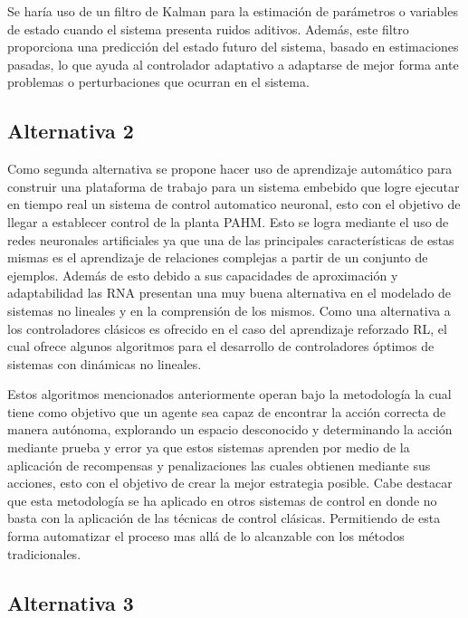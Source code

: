\documentclass[12pt]{article}
\begin{document}
Se haría uso de un filtro de Kalman para la estimación de parámetros o variables de estado cuando el sistema presenta ruidos aditivos. Además, este filtro proporciona una predicción del estado futuro del sistema, basado en estimaciones pasadas, lo que ayuda al controlador adaptativo a adaptarse de mejor forma ante problemas o perturbaciones que ocurran en el sistema\cite{15_tec}.

\subsection{Alternativa 2}

Como segunda alternativa se propone hacer uso de aprendizaje automático para construir una plataforma de trabajo para un sistema embebido que logre ejecutar en tiempo real un sistema de control automatico neuronal, esto con el objetivo de llegar a establecer control de la planta PAHM. Esto se logra mediante el uso de redes neuronales artificiales ya que una de las principales características de estas mismas es el aprendizaje de relaciones complejas a partir de un conjunto de ejemplos. Además de esto debido a sus capacidades de aproximación y adaptabilidad las RNA presentan una muy buena alternativa en el modelado de sistemas no lineales y en la comprensión de los mismos. Como una alternativa a los controladores clásicos es ofrecido en el caso del aprendizaje reforzado RL, el cual ofrece algunos algoritmos para el desarrollo de controladores óptimos de sistemas con dinámicas no lineales\cite{15_tec}. 

Estos algoritmos mencionados anteriormente operan bajo la metodología la cual tiene como objetivo que un agente sea capaz de encontrar la acción correcta de manera autónoma, explorando un espacio desconocido y determinando la acción mediante prueba y error ya que estos sistemas aprenden por medio de la aplicación de recompensas y penalizaciones las cuales obtienen mediante sus acciones, esto con el objetivo de crear la mejor estrategia posible. Cabe destacar que esta metodología se ha aplicado en otros sistemas de control en donde no basta con la aplicación de las técnicas de control clásicas. Permitiendo de esta forma automatizar el proceso mas allá de lo alcanzable con los métodos tradicionales\cite{naizhang2022intel}. 


\subsection{Alternativa 3}
\end{document}
